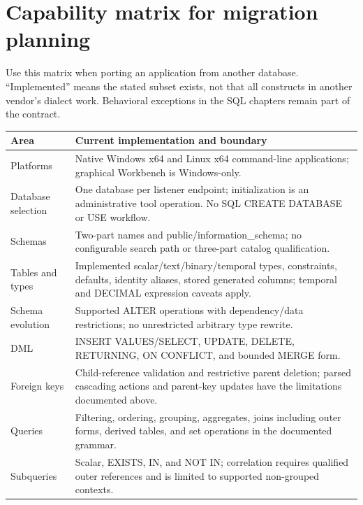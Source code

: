 
\section{Capability matrix for migration planning}

Use this matrix when porting an application from another database. ``Implemented'' means the stated subset exists, not that all constructs in another vendor's dialect work. Behavioral exceptions in the SQL chapters remain part of the contract.

\begin{longtable}{p{.27\linewidth}p{.64\linewidth}}
\toprule Area & Current implementation and boundary \\\midrule
Platforms & Native Windows x64 and Linux x64 command-line applications; graphical Workbench is Windows-only. \\
Database selection & One database per listener endpoint; initialization is an administrative tool operation. No SQL CREATE DATABASE or USE workflow. \\
Schemas & Two-part names and public/information\_schema; no configurable search path or three-part catalog qualification. \\
Tables and types & Implemented scalar/text/binary/temporal types, constraints, defaults, identity aliases, stored generated columns; temporal and DECIMAL expression caveats apply. \\
Schema evolution & Supported ALTER operations with dependency/data restrictions; no unrestricted arbitrary type rewrite. \\
DML & INSERT VALUES/SELECT, UPDATE, DELETE, RETURNING, ON CONFLICT, and bounded MERGE form. \\
Foreign keys & Child-reference validation and restrictive parent deletion; parsed cascading actions and parent-key updates have the limitations documented above. \\
Queries & Filtering, ordering, grouping, aggregates, joins including outer forms, derived tables, and set operations in the documented grammar. \\
Subqueries & Scalar, EXISTS, IN, and NOT IN; correlation requires qualified outer references and is limited to supported non-grouped contexts. \\

\end{longtable}
